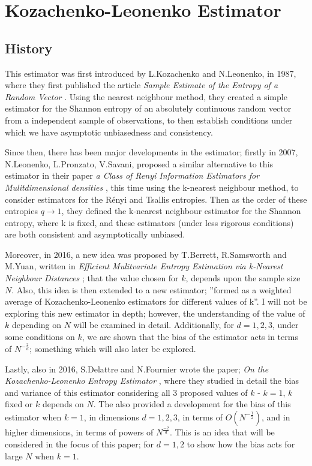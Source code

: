\documentclass{report}
\begin{document}
\chapter{Kozachenko-Leonenko Estimator} \label{KLEstChp}

\section{History}

This estimator was first introduced by L.Kozachenko and N.Leonenko, in 1987, where they first published the article \textit{Sample Estimate of the Entropy of a Random Vector} \cite{paper1}. Using the nearest neighbour method, they created a simple estimator for the Shannon entropy of an absolutely continuous random vector from a independent sample of observations, to then establish conditions under which we have asymptotic unbiasedness and consistency.

Since then, there has been major developments in the estimator; firstly in 2007, N.Leonenko, L.Pronzato, V.Savani, proposed a similar alternative to this estimator in their paper \textit{a Class of Renyi Information Estimators for Mulitdimensional densities} \cite{paper2}, this time using the k-nearest neighbour method, to consider estimators for the R\'enyi and Tsallis entropies. Then as the order of these entropies $q \to 1$, they defined the k-nearest neighbour estimator for the Shannon entropy, where k is fixed, and these estimators (under less rigorous conditions) are both consistent and asymptotically unbiased.

Moreover, in 2016, a new idea was proposed by T.Berrett, R.Samsworth and M.Yuan, written in \textit{Efficient Mulitvariate Entropy Estimation via k-Nearest Neighbour Distances} \cite{paper4}; that the value chosen for $k$, depends upon the sample size $N$. Also, this idea is then extended to a new estimator; ''formed as a weighted average of Kozachenko-Leonenko estimators for different values of k''. I will not be exploring this new estimator in depth; however, the understanding of the value of $k$ depending on $N$ will be examined in detail. Additionally, for $d=1, 2,3$, under some conditions on $k$, we are shown that the bias of the estimator acts in terms of $N^{-\frac{2}{d}}$; something which will also later be explored.

Lastly, also in 2016, S.Delattre and N.Fournier wrote the paper; \textit{On the Kozachenko-Leonenko Entropy Estimator} \cite{paper3}, where they studied in detail the bias and variance of this estimator considering all 3 proposed values of $k$ - $k = 1$, $k$ fixed or $k$ depends on $N$. The also provided a development for the bias of this estimator when $k=1$, in dimensions $d=1,2,3$, in terms of $O(N^{-\frac{1}{2}})$, and in higher dimensions, in terms of powers of $N^{\frac{-2}{d}}$. This is an idea that will be considered in the focus of this paper; for $d=1,2$ to show how the bias acts for large $N$ when $k=1$.
\end{document}
